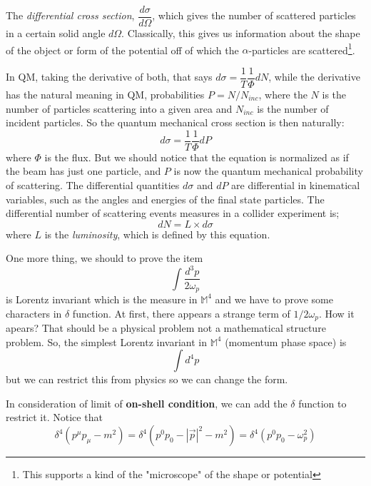 \documentclass[12pt,openany]{book}
\begin{document}
	The \textit{differential cross section}, $\dfrac{d\sigma}{d\Omega}$, which gives the number of scattered particles in a certain solid angle 
	$d\Omega$. Classically, this gives us information about the shape of the object or form of the potential off of which the $\alpha$-particles are 
	scattered\footnote{This supports a kind of the "microscope" of the shape or potential}.\par 
	In QM, taking the derivative of both, that says $d\sigma=\dfrac{1}{T}\dfrac{1}{\Phi}dN$, while the derivative has the 
	natural meaning in QM, probabilities $P=N/N_{inc}$, where the $N$ is the number of particles scattering into a given area and $N_{inc}$ is the number of incident particles. 
	So the quantum mechanical cross section is then naturally:
	\begin{equation}
		d\sigma=\frac{1}{T}\frac{1}{\Phi}dP
	\end{equation}
	where $\Phi$ is the flux. But we should notice that the equation is normalized as if the beam has just one particle, and $P$ is now the quantum mechanical probability of scattering.
	The differential quantities $d\sigma$ and $dP$ are differential in kinematical variables, such as the angles and energies of the final
	state particles. The differential number of scattering events measures in a collider experiment is;
	\begin{equation}
		dN=L\times d\sigma
	\end{equation}
	where $L$ is the \textit{luminosity}, which is defined by this equation.\par 
	One more thing, we should to prove the item \begin{equation}
		\int\frac{d^3p}{2\omega_p}
	\end{equation} is Lorentz invariant which is the measure in $\mathbb{M}^4$ and we have to prove some 
	characters in $\delta$ function. At first, there appears a strange term of $1/{2\omega_p}$.
	How it apears? That should be a physical problem not a mathematical structure problem. So, the simplest 
	Lorentz invariant in $\mathbb{M}^4$ (momentum phase space) is 
	\begin{equation}
		\int d^4p
	\end{equation}
	but we can restrict this from physics so we can change the form. 
	\par 
	In consideration of limit of \textbf{on-shell condition}, we can add the $\delta$ function to restrict it. Notice that
	\begin{equation}
		\delta^4(p^\mu p_\mu-m^2)=\delta^4(p^0p_0-|\vec{p}|^2-m^2)=\delta^4(p^0p_0-\omega_p^2)
	\end{equation}
\end{document}
